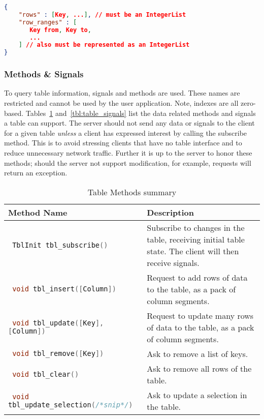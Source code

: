 \documentclass[11pt, oneside]{amsart}
\begin{document}
\begin{lstlisting}[language=json, label=listing:selection_object, caption=Selection object definition. Note that the \texttt{to} field in the row ranges is exclusive. The \texttt{row\_ranges} list \textit{must} have an even number of elements. ]
{
	"rows" : [Key, ...], // must be an IntegerList
	"row_ranges" : [
	   Key from, Key to,
	   ...
	] // also must be represented as an IntegerList
}
\end{lstlisting}

\subsubsection{Methods \& Signals}

To query table information, signals and methods are used. These names are restricted and cannot be used by the user application. Note, indexes are all zero-based. Tables~\ref{tbl:table_methods} and~\ref{tbl:table_signals} list the data related methods and signals a table can support. The server should not send any data or signals to the client for a given table \emph{unless} a client has expressed interest by calling the subscribe method. This is to avoid stressing clients that have no table interface and to reduce unnecessary network traffic. Further it is up to the server to honor these methods; should the server not support modification, for example, requests will return an exception.

\begin{table}
	\begin{tabularx}{.9\textwidth}{p{2.5in}X}
		\toprule
		Method Name & Description \\
		\midrule
		\lstinline[language=c++]| TblInit tbl_subscribe() |
		&
		Subscribe to changes in the table, receiving initial table state. The client will then receive signals.
		\\
		\lstinline[language=c++]| void tbl_insert([Column]) |
		&
		Request to add rows of data to the table, as a pack of column segments.
		\\
        \lstinline[language=c++]| void tbl_update([Key], [Column]) |
        &
        Request to update many rows of data to the table, as a pack of column segments.
        \\
		\lstinline[language=c++]| void tbl_remove([Key]) |
		&
		Ask to remove a list of keys.
		\\
		\lstinline[language=c++]| void tbl_clear() |
		&
		Ask to remove all rows of the table.
		\\
		\lstinline[language=c++]| void tbl_update_selection(/*snip*/) |
		&
		Ask to update a selection in the table.
		\\
		\bottomrule
	\end{tabularx}
	\caption{Table Methods summary}
	\label{tbl:table_methods}
\end{table}
\end{document}
